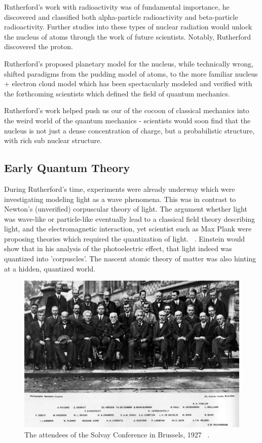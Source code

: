 Rutherford's work with radioactivity was of fundamental importance, he
discovered and classified both alpha-particle radioactivity and beta-particle
radioactivity. Further studies into these types of nuclear radiation would
unlock the nucleus of atoms through the work of future scientists. Notably,
Rutherford discovered the proton.

Rutherford's proposed planetary model for the nucleus, while technically wrong,
shifted paradigms from the pudding model of  atoms, to the more familiar nucleus
+ electron cloud model which has been spectacularly modeled and verified with
the forthcoming scientists which defined the field of quantum mechanics.

Rutherford's work helped push us our of the cocoon of classical mechanics into
the weird world of the quantum mechanics - scientists would soon find that the
nucleus is not just a dense concentration of charge, but a probabilistic
structure, with rich sub nuclear structure.

\clearpage
\subsection{Early Quantum Theory}

During Rutherford's time, experiments were already underway which were
investigating modeling light as a wave phenomena. This was in contrast to
Newton's (unverified) corpuscular theory of light. The argument whether light
was wave-like or particle-like eventually lead to a classical field theory
describing light, and the electromagnetic interaction, yet scientist such as Max
Plank were proposing theories which required the quantization of light.
~\needcite{}. Einstein would show that in his analysis of the photoelectric
effect, that light indeed was quantized into 'corpuscles'. The nascent atomic
theory of matter was also hinting at a hidden, quantized world.

\begin{figure}
	\centering
	\includegraphics[width=\linewidth]{../Chapter2/fig/solvay.jpg}
	\caption{
		The attendees of the Solvay Conference in Brussels, 1927
	~\cite{BenjaminCroupie1927}.
	}
	\label{fig:solvay}
\end{figure}

